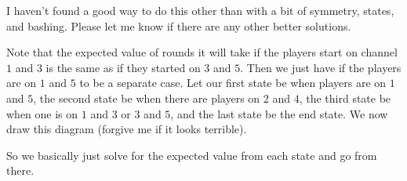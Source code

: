 \begin{solution}\hfil\medskip

I haven't found a good way to do this other than with a bit of symmetry, states, and bashing. Please let me know if there are any other better solutions.


\begin{center}
\end{center}

Note that the expected value of rounds it will take if the players start on channel $1$ and $3$ is the same as if they started on $3$ and $5$. Then we just have if the players are on $1$ and $5$ to be a separate case. Let our first state be when players are on $1$ and $5$, the second state be when there are players on $2$ and $4$, the third state be when one is on $1$ and $3$ or $3$ and $5$, and the last state be the end state. We now draw this diagram (forgive me if it looks terrible).


\begin{center}
\end{center}


So we basically just solve for the expected value from each state and go from there. 


\end{solution}
